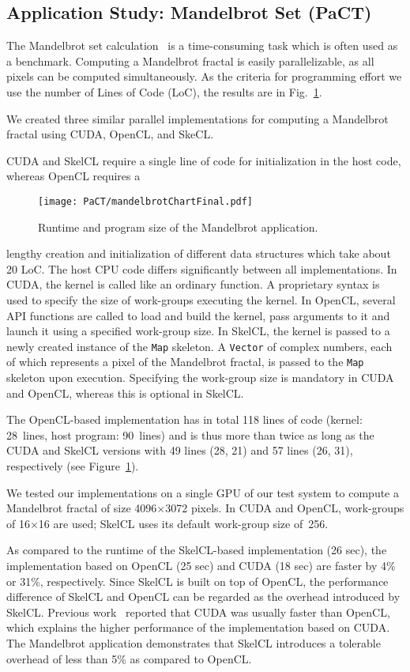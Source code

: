 \subsection{Application Study: Mandelbrot Set (PaCT)}
\label{sec:mandelbrot}

The Mandelbrot set calculation~\cite{Mandelbrot-80} is a time-consuming task which is often used as a benchmark. Computing a Mandelbrot fractal is easily parallelizable, as all pixels can be computed simultaneously.
As the criteria for programming effort we use the number of Lines of Code (LoC), the results are in Fig.~\ref{fig:mandelbrot_runtime}. 

We created three similar parallel implementations for computing a Mandelbrot fractal using CUDA, OpenCL, and SkeCL.

CUDA and SkelCL require a single line of code for initialization in the host code, whereas OpenCL requires a
\begin{figure}
    \centering
    \texttt{[image: PaCT/mandelbrotChartFinal.pdf]}
    \caption{Runtime and program size of the Mandelbrot application.}
    \label{fig:mandelbrot_runtime}
\end{figure}%
lengthy creation and initialization of different data structures which take about 20 LoC.
The host CPU code differs significantly between all implementations.
In CUDA, the kernel is called like an ordinary function.
A proprietary syntax is used to specify the size of work-groups executing the kernel.
In OpenCL, several API functions are called to load and build the kernel, pass arguments to it and launch it using a specified work-group size.
In SkelCL, the kernel is passed to a newly created instance of the \texttt{Map} skeleton.
A \texttt{Vector} of complex numbers, each of which represents a pixel of the Mandelbrot fractal, is passed to the \texttt{Map} skeleton upon execution.
Specifying the work-group size is mandatory in CUDA and OpenCL, whereas this is optional in SkelCL.

The OpenCL-based implementation has in total 118 lines of code (kernel: 28~lines, host program: 90~lines) and is thus more than twice as long as the CUDA and SkelCL versions with 49 lines (28, 21) and 57 lines (26, 31), respectively (see Figure~\ref{fig:mandelbrot_runtime}).

We tested our implementations on a single GPU of our test system to compute a Mandelbrot fractal of size 4096$\times$3072 pixels.
In CUDA and OpenCL, work-groups of 16$\times$16 are used; SkelCL uses its default work-group size of~256.

As compared to the runtime of the SkelCL-based implementation (26 sec), the implementation based on OpenCL (25 sec) and CUDA (18 sec) are faster by 4\% or 31\%, respectively.
Since SkelCL is built on top of OpenCL, the performance difference of SkelCL and OpenCL can be regarded as the overhead introduced by SkelCL\@.
Previous work~\cite{KoDYLCSMZ-10} reported that CUDA was usually faster than OpenCL, which explains the higher performance of the implementation based on CUDA.
The Mandelbrot application demonstrates that SkelCL introduces a tolerable overhead of less than 5\% as compared to OpenCL.

